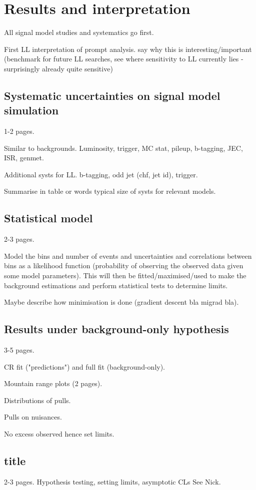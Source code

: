 \chapter{Results and interpretation}
\label{chap:results}

All signal model studies and systematics go first.

First LL interpretation of prompt analysis. say why this is 
interesting/important (benchmark for future LL searches, see where sensitivity 
to LL currently lies - surprisingly already quite sensitive)


\section{Systematic uncertainties on signal model simulation}
1-2 pages.

Similar to backgrounds.
Luminosity, trigger, MC stat, pileup, b-tagging, JEC, ISR, genmet.

Additional systs for LL.
b-tagging, odd jet (chf, jet id), trigger.

Summarise in table or words typical size of systs for relevant models.


\section{Statistical model}
2-3 pages.

Model the bins and number of events and uncertainties and correlations between 
bins as a likelihood function (probability of observing the observed data given 
some model parameters). This will then be fitted/maximised/used to make the 
background estimations and perform statistical tests to determine limits.

Maybe describe how minimisation is done (gradient descent bla migrad bla).


\section{Results under background-only hypothesis}
3-5 pages.

CR fit ("predictions") and full fit (background-only).

Mountain range plots (2 pages).

Distributions of pulls.

Pulls on nuisances.

No excess observed hence set limits.

\section{title}
2-3 pages.
Hypothesis testing, setting limits, asymptotic CLs
See Nick.

